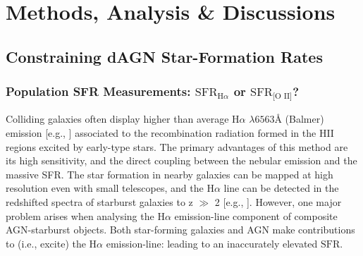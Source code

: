\section{Methods, Analysis \& Discussions}
\subsection{Constraining dAGN Star-Formation Rates}
\subsubsection{Population SFR Measurements: $\text{SFR}_{\text{H}\alpha}$ or $\text{SFR}_{\text{[O II]}}$?}

Colliding galaxies often display higher than average $\text{H}\alpha$ $\lambda 6563${\AA } (Balmer) emission [e.g., \cite{Kennicutt_1987}] associated to the recombination radiation formed in the HII regions excited by early-type stars. The primary advantages of this method are its high sensitivity, and the direct coupling between the nebular emission and the massive SFR. The star formation in nearby galaxies can be mapped at high resolution even with small telescopes, and the $\text{H}\alpha$ line can be detected in the redshifted spectra of starburst galaxies to z $\gg$ 2 [e.g., \cite{1997ApJ...477L..29B}]. However, one major problem arises when analysing the $\text{H}\alpha$ emission-line component of composite AGN-starburst objects. Both star-forming galaxies and AGN make contributions to (i.e., excite) the $\text{H}\alpha$ emission-line: leading to an inaccurately elevated $\text{SFR}$. 

